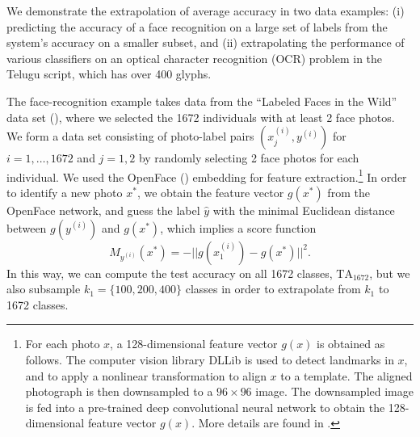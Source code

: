 \documentclass[twoside,11pt]{article}
\begin{document}

We demonstrate the extrapolation of average accuracy in two data examples:
(i) predicting the
accuracy of a face recognition on a large set of labels from the
system's accuracy on a smaller subset, and (ii) extrapolating the performance of various classifiers on an optical character recognition (OCR) problem in the Telugu script, which has over 400 glyphs.

The face-recognition example takes data from the ``Labeled Faces in the Wild'' data set (\cite{LFWTech}), where we selected the 1672 individuals with at least 2 face photos.  We form a
data set consisting of photo-label pairs $(x_j^{(i)}, y^{(i)})$
for $i = 1,\hdots, 1672$ and $j = 1,2$ by randomly selecting 2 face
photos for each individual. 
We used the OpenFace (\cite{amos2016openface}) embedding for feature
extraction.\footnote{For each photo $x$, a 128-dimensional feature vector
$g(x)$ is obtained as follows.  The computer vision library DLLib is
used to detect landmarks in $x$, and to apply a nonlinear
transformation to align $x$ to a template.  The aligned photograph is
then downsampled to a $96 \times 96$ image. The downsampled image is
fed into a pre-trained deep convolutional neural network to obtain the
128-dimensional feature vector $g(x)$. More details are found in
\cite{amos2016openface}.}
In order to identify a new photo $x^*$, we obtain the feature
vector $g(x^*)$ from the OpenFace network, and guess the label $\hat{y}$
with the minimal Euclidean distance between $g(y^{(i)})$ and $g(x^*)$,
which implies a score function
\[
M_{y^{(i)}}(x^*) = -||g(x_1^{(i)}) - g(x^*)||^2.
\]
In this way, we can compute the test accuracy on all 1672 classes, $\text{TA}_{1672}$, but we also subsample $k_1 = \{100,200,400\}$ classes in order to extrapolate from $k_1$ to 1672 classes.
\end{document}
